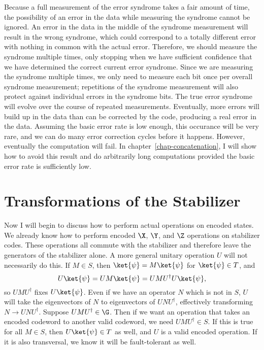 Because a full measurement of the error syndrome takes a fair amount of
time, the possibility of an error in the data while measuring the syndrome
cannot be ignored.  An error in the data in the middle of the syndrome
measurement will result in the wrong syndrome, which could correspond
to a totally different error with nothing in common with the actual error.
Therefore, we should measure the syndrome multiple times, only stopping
when we have sufficient confidence that we have determined the correct
current error syndrome.  Since we are measuring the syndrome multiple
times, we only need to measure each bit once per overall syndrome
measurement; repetitions of the syndrome measurement will also protect
against individual errors in the syndrome bits.  The true error syndrome will
evolve over the course of repeated measurements.  Eventually, more
errors will build up in the data than can be corrected by the code,
producing a real error in the data.  Assuming the basic error rate is low
enough, this occurance will be very rare, and we can do many error
correction cycles before it happens.  However, eventually the computation will
fail.  In chapter~\ref{chap-concatenation}, I will show how to avoid this
result and do arbitrarily long computations provided the basic error rate is
sufficiently low.

\section{Transformations of the Stabilizer}
\label{sec-normalizer}

Now I will begin to discuss how to perform actual operations on encoded
states.  We already know how to perform encoded $\X$, $\Y$, and $\Z$
operations on stabilizer codes.  These operations all commute with the
stabilizer and therefore leave the generators of the stabilizer alone.  A
more general unitary operation $U$ will not necessarily do this.  If $M \in
S$, then $\ket{\psi} = M \ket{\psi}$ for $\ket{\psi} \in T$, and
\begin{equation}
	U \ket{\psi} = U M \ket{\psi} = UMU^\dagger U \ket{\psi},
\end{equation}
so $U M U^\dagger$ fixes $U \ket{\psi}$.  Even if we have an operator $N$
which is not in $S$, $U$ will take the eigenvectors of $N$ to eigenvectors
of $U N U^\dagger$, effectively transforming $N \rightarrow U N U^\dagger$.
Suppose $U M U^\dagger \in \G$.  Then if we want an operation that takes an
encoded codeword to another valid codeword, we need $U M U^\dagger \in S$.
If this is true for all $M \in S$, then $U \ket{\psi} \in T$ as well, and $U$
is a valid encoded operation.  If it is also transversal, we know it will be
fault-tolerant as well.

